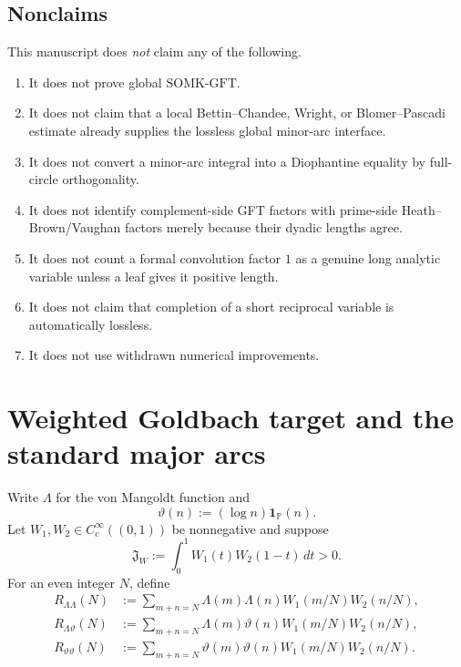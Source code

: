 \documentclass[11pt]{article}
\theoremstyle{definition}
\theoremstyle{remark}
\newcommand{\Pp}{\mathbb P}
\newcommand{\1}{\mathbf 1}
\newcommand{\Jw}{\mathfrak J_W}
\newcommand{\SOMK}{\mathrm{SOMK}\text{-}\mathrm{GFT}}
\begin{document}
\subsection{Nonclaims}

This manuscript does \emph{not} claim any of the following.
\begin{enumerate}[label=\textup{(N\arabic*)},leftmargin=2.4em]
\item It does not prove global \(\SOMK\).
\item It does not claim that a local Bettin--Chandee, Wright, or Blomer--Pascadi estimate already supplies the lossless global minor-arc interface.
\item It does not convert a minor-arc integral into a Diophantine equality by full-circle orthogonality.
\item It does not identify complement-side GFT factors with prime-side Heath--Brown/Vaughan factors merely because their dyadic lengths agree.
\item It does not count a formal convolution factor \(1\) as a genuine long analytic variable unless a leaf gives it positive length.
\item It does not claim that completion of a short reciprocal variable is automatically lossless.
\item It does not use withdrawn numerical improvements.
\end{enumerate}

\section{Weighted Goldbach target and the standard major arcs}\label{sec:goldbach-target}

Write \(\Lambda\) for the von Mangoldt function and
\[
 \vartheta(n):=(\log n)\1_{\Pp}(n).
\]
Let \(W_1,W_2\in C_c^\infty((0,1))\) be nonnegative and suppose
\begin{equation}\label{eq:Jw}
 \Jw:=\int_0^1 W_1(t)W_2(1-t)\,dt>0.
\end{equation}
For an even integer \(N\), define
\begin{align}
 R_{\Lambda\Lambda}(N)
 &:={\sum}_{m+n=N}\Lambda(m)\Lambda(n)W_1(m/N)W_2(n/N),\label{eq:RLL}\\
 R_{\Lambda\vartheta}(N)
 &:={\sum}_{m+n=N}\Lambda(m)\vartheta(n)W_1(m/N)W_2(n/N),\label{eq:RLtheta}\\
 R_{\vartheta\vartheta}(N)
 &:={\sum}_{m+n=N}\vartheta(m)\vartheta(n)W_1(m/N)W_2(n/N).\label{eq:Rtt}
\end{align}
\end{document}
